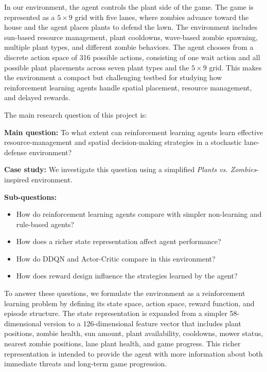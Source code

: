 \documentclass[conference,onecolumn]{IEEEtran}
\begin{document}
In our environment, the agent controls the plant side of the game. The game is represented as a $5 \times 9$ grid with five lanes, where zombies advance toward the house and the agent places plants to defend the lawn. The environment includes sun-based resource management, plant cooldowns, wave-based zombie spawning, multiple plant types, and different zombie behaviors. The agent chooses from a discrete action space of 316 possible actions, consisting of one wait action and all possible plant placements across seven plant types and the $5 \times 9$ grid. This makes the environment a compact but challenging testbed for studying how reinforcement learning agents handle spatial placement, resource management, and delayed rewards.

The main research question of this project is:

\begin{tcolorbox}[
colback=gray!5,
colframe=black!60,
title=Research Questions,
fonttitle=\bfseries
]
\textbf{Main question:} To what extent can reinforcement learning agents learn effective resource-management and spatial decision-making strategies in a stochastic lane-defense environment?

\vspace{0.5em}

\textbf{Case study:} We investigate this question using a simplified \textit{Plants vs. Zombies}-inspired environment.

\vspace{0.5em}

\textbf{Sub-questions:}
\begin{itemize}
    \item How do reinforcement learning agents compare with simpler non-learning and rule-based agents?
    \item How does a richer state representation affect agent performance?
    \item How do DDQN and Actor-Critic compare in this environment?
    \item How does reward design influence the strategies learned by the agent?
\end{itemize}
\end{tcolorbox}

To answer these questions, we formulate the environment as a reinforcement learning problem by defining its state space, action space, reward function, and episode structure. The state representation is expanded from a simpler 58-dimensional version to a 126-dimensional feature vector that includes plant positions, zombie health, sun amount, plant availability, cooldowns, mower status, nearest zombie positions, lane plant health, and game progress. This richer representation is intended to provide the agent with more information about both immediate threats and long-term game progression.
\end{document}
